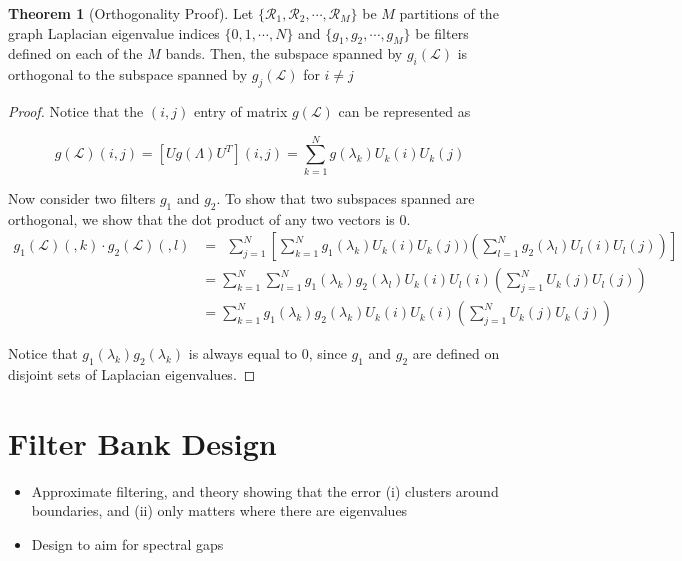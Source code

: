\documentclass[a4paper]{article}
\newcommand{\R}{\mathcal{R}}
\newcommand{\La}{\mathcal{L}}
\theoremstyle{definition}
\newtheorem*{thm}{Theorem}
\begin{document}
\begin{thm}[Orthogonality Proof]

Let $\{\R_1, \R_2, \cdots, \R_M\}$ be $M$ partitions of the graph Laplacian eigenvalue indices $\{0, 1, \cdots,  N \}$ and $\{g_1, g_2, \cdots, g_M \}$ be filters defined on each of the $M$ bands. Then, the subspace spanned by $g_i(\La)$ is orthogonal to the subspace spanned by $g_j(\La)$ for $i \neq j$

\end{thm}

\begin{proof}


Notice that the $(i,j)$ entry of matrix $g(\La)$ can be represented as 

$$g(\La) (i,j) = [Ug(\Lambda)U^T] (i,j) = \sum_{k = 1}^{N} g(\lambda_k) U_k(i) U_k(j)$$

Now consider two filters $g_1$ and $g_2$. To show that two subspaces spanned are orthogonal, we show that the dot product of any two vectors is 0.
\begin{align*}
g_1(\La)(,k) \cdot g_2(\La)(,l)&=\ \  \sum_{j = 1}^{N} [\sum_{k = 1}^{N} g_1(\lambda_k) U_k(i) U_k(j) )( \sum_{l = 1}^{N} g_2(\lambda_l) U_l(i) U_l(j)) ] \\
& = \sum_{k = 1}^{N} \sum_{l = 1}^{N} g_1(\lambda_k) g_2(\lambda_l)  U_k(i) U_l(i) ( \sum_{j = 1}^{N}  U_k(j)  U_l(j))  \\
& = \sum_{k = 1}^{N} g_1(\lambda_k) g_2(\lambda_k)  U_k(i) U_k(i) ( \sum_{j = 1}^{N}  U_k(j)  U_k(j)) 
\end{align*}

Notice that $g_1(\lambda_k) g_2(\lambda_k)$ is always equal to $0$, since $g_1$ and $g_2$ are defined on disjoint sets of Laplacian eigenvalues.   

\end{proof}








\newpage

{\color{blue}
\section{Filter Bank Design}
\begin{itemize}
\item Approximate filtering, and theory showing that the error (i) clusters around boundaries, and (ii) only matters where there are eigenvalues
\item Design to aim for spectral gaps
\end{itemize}
}
\end{document}
